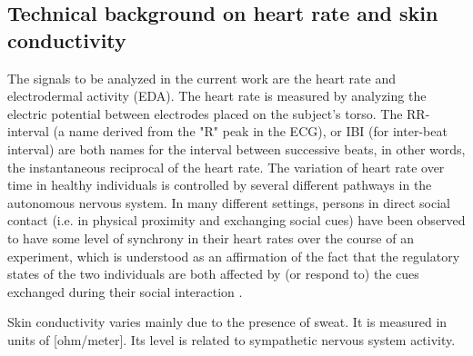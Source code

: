 \documentclass[a4paper, 11pt]{article}      %
\begin{document}
\subsection{Technical background on heart rate and skin \mbox{conductivity}}
The signals to be analyzed in the current work are the heart rate and electrodermal activity (EDA). 
The heart rate is measured by analyzing the electric potential between electrodes placed on the subject's torso. The RR-interval (a name derived from the "R" peak in the ECG), or IBI (for inter-beat interval) are both names for the interval between successive beats, in other words, the instantaneous reciprocal of the heart rate. The variation of heart rate over time in healthy individuals is controlled by several different pathways in the autonomous nervous system. In many different settings, persons in direct social contact (i.e. in physical proximity and exchanging social cues) have been observed to have some level of synchrony in their heart rates over the course of an experiment, which is understood as an affirmation of the fact that the regulatory states of the two individuals are both affected by (or respond to) the cues exchanged during their social interaction \citep{palumbo2017interpersonal}.

Skin conductivity varies mainly due to the presence of sweat. It is measured in units of [ohm\slash meter]. Its level is related to sympathetic nervous system activity.
\end{document}
